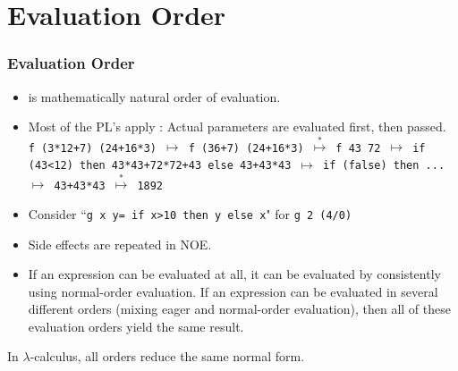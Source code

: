 \section{Evaluation Order}
\begin{frame}
\frametitle{Evaluation Order}
\begin{itemize}
\item {} is mathematically natural order of evaluation.
\item Most of the PL's apply : Actual parameters are evaluated
first, then passed.\\
\texttt{\scriptsize f (3*12+7) (24+16*3) $\mapsto$
	f (36+7) (24+16*3) $\stackrel{*}{\mapsto}$
	f 43 72 $\mapsto$  if (43<12) then 43*43+72*72+43 
                  else 43+43*43 $\mapsto$ if (false) then ... $\mapsto$
	43+43*43 $\stackrel{*}{\mapsto}$ 1892}\hfill {}
\item Consider ``\lstinline!g x y= if x>10 then y else x!"  for \texttt{g 2 (4/0)}
\item Side effects are repeated in NOE.
\item {} {\small\rm
If an expression can be evaluated at all, it can be evaluated by consistently using
normal-order evaluation. If an expression can be evaluated in several different orders
(mixing eager and normal-order evaluation), then all of these evaluation orders yield
the same result.}
\end{itemize}
\end{frame}

\begin{frame}
In $\lambda$-calculus, all orders reduce the same normal form.\\
\tiny
{}
\end{frame}


